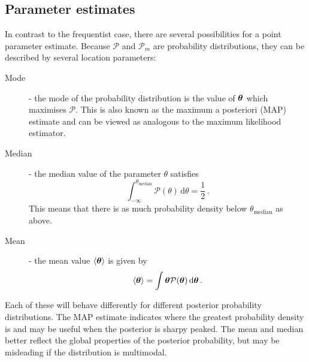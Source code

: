 \subsection{Parameter estimates}

In contrast to the frequentist case, there are several possibilities for a point parameter estimate. Because $\mathcal{P}$ and $\mathcal{P}_m$ are probability distributions, they can be described by several location parameters:

\begin{description}
\item[Mode] - the mode of the probability distribution is the value of $\boldsymbol\theta$ which maximises $\mathcal{P}$. This is also known as the maximum a posteriori (MAP) estimate and can be viewed as analogous to the maximum likelihood estimator.
\item[Median] - the median value of the parameter $\theta$ satisfies
\begin{equation}
\int_{-\infty}^{\theta_\textrm{median}} \mathcal{P}(\theta) \, \mathrm{d}\theta = \frac{1}{2}\,.
\end{equation}
This means that there is as much probability density below $\theta_\textrm{median}$ as above.
\item[Mean] - the mean value $\langle \boldsymbol\theta \rangle$ is given by 
\begin{equation}
\langle \boldsymbol\theta \rangle = \int \boldsymbol\theta \mathcal{P}(\boldsymbol\theta) \, \mathrm{d}\boldsymbol\theta\,.
\end{equation}
\end{description}
Each of these will behave differently for different posterior probability distributions. The MAP estimate indicates where the greatest probability density is and may be useful when the posterior is sharpy peaked. The mean and median better reflect the global properties of the posterior probability, but may be misleading if the distribution is multimodal. 


